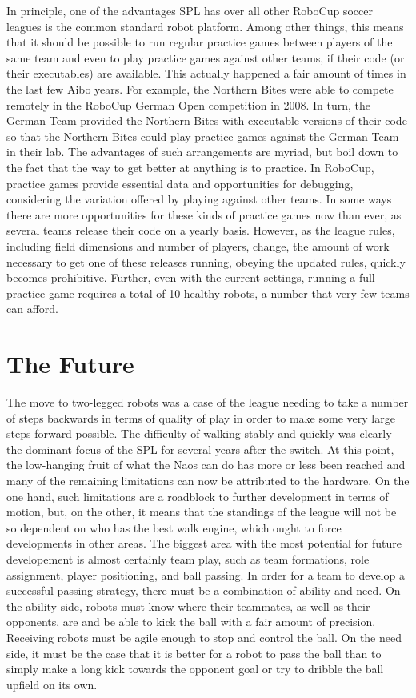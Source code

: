 \documentclass{llncs}
\begin{document}
In principle, one of the
advantages SPL has over all other RoboCup soccer
leagues is the common standard robot platform. Among other things, this
means that it should be possible to run regular practice games between players of the same team and even
to play practice games against other teams, if their code (or their executables) are available. This actually happened a fair amount of times in the last few
Aibo years. For example, the Northern Bites were able to compete remotely
in the RoboCup German Open competition in 2008. In turn, the German Team provided the
Northern Bites with executable versions of their code so that the Northern
Bites could play practice games against the German Team in their lab. The advantages of
such arrangements are myriad, but boil down to the fact that the way to
get better at anything is to practice. In RoboCup, practice games provide
essential data and opportunities for debugging, considering the variation offered by playing
against other teams. In some
ways there are more opportunities for these kinds of practice games now than
ever, as several teams release their code on a yearly
basis. However, as the league rules, including field dimensions and number of players, change, the amount of work necessary to get
one of these releases running, obeying the updated rules, quickly becomes prohibitive.
Further, even with the current settings, running a full practice game requires a total of 10 healthy robots, a number
that very few teams can afford.

\section{The Future}

The move to two-legged robots was a case of the league needing to take a number
of steps backwards in terms of quality of play in order to make some very large
steps forward possible. The difficulty of walking stably and quickly was clearly the dominant
focus of the SPL for several years after the switch. At this point, the
low-hanging fruit of what the Naos can do has more or less been reached and many of the
remaining limitations can now be attributed to the hardware. On the one hand, such limitations
are a roadblock to further development in terms of motion, but, on the other,
it means that the standings of the league will not be so dependent on who
has the best walk engine, which ought to force developments in other areas.
The biggest area with the most potential for future developement is almost certainly team play,
such as team formations, role assignment, player positioning, and ball passing. In order for a team to develop a successful passing strategy,
there must be a combination of ability and need. On the ability side, robots must
know where their teammates, as well as their opponents, are and be able to kick the ball with a fair amount
of precision. Receiving robots must be agile enough to stop and control the
ball. On the need side, it must be the case that it is better for a robot to pass
the ball than to simply make a long kick towards the opponent goal or try to dribble the ball
upfield on its own.
\end{document}
